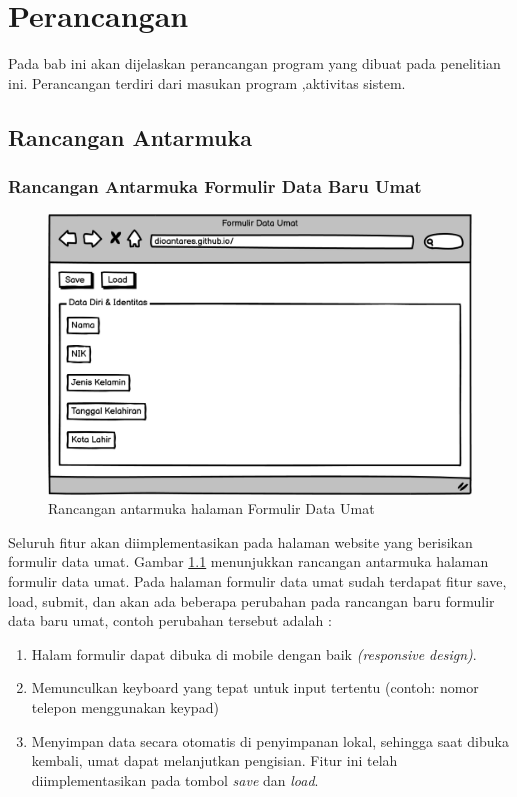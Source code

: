 \chapter{Perancangan}
\label{chap:perancangan}

Pada bab ini akan dijelaskan perancangan program yang dibuat pada penelitian ini. Perancangan terdiri dari masukan program ,aktivitas sistem.

\section{Rancangan Antarmuka}

\subsection{Rancangan Antarmuka Formulir Data Baru Umat}

\begin{figure}[H]
	\centering
	\includegraphics[scale=0.7]{Gambar/mockUpWebsite.png}
	\caption{Rancangan antarmuka halaman Formulir Data Umat} 
	\label{fig:formDataUmat}
\end{figure}

Seluruh fitur akan diimplementasikan pada halaman website yang berisikan formulir data umat. Gambar \ref{fig:formDataUmat} menunjukkan rancangan antarmuka halaman formulir data umat. Pada halaman formulir data umat sudah terdapat fitur save, load, submit, dan akan ada  beberapa perubahan pada rancangan baru formulir data baru umat, contoh perubahan tersebut adalah : 

\begin{enumerate}
	\item Halam formulir dapat dibuka di mobile dengan baik \textit{(responsive design)}.
	\item Memunculkan keyboard yang tepat untuk input tertentu (contoh: nomor telepon menggunakan keypad)
	\item Menyimpan data secara otomatis di penyimpanan lokal, sehingga saat dibuka kembali, umat dapat melanjutkan pengisian. Fitur ini telah diimplementasikan pada tombol \textit{save} dan \textit{load}.
\end{enumerate}

